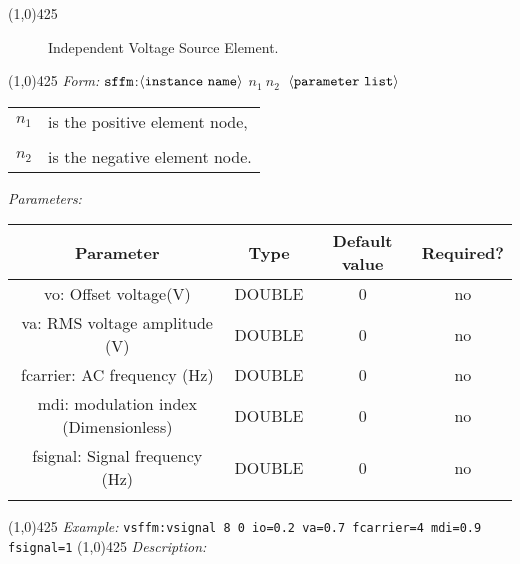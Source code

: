 \documentclass{article}
\begin{document}
\hrulefill\linethickness{0.5mm}\line(1,0){425}
\normalsize
\newline
\begin{figure}[h]
\centerline{\epsfxsize=0.5in}
\caption{Independent Voltage Source Element.}
\end{figure}
\newline
\linethickness{0.5mm} \line(1,0){425}
\newline
\textit{Form:}
$\tt sffm$:$\langle \tt{instance\ name}\rangle$
$n_1\ n_2\ $ $\langle \tt{parameter\ list}\rangle$
\newline
\begin{tabular}{r l}
$n_1$ & is the positive element node, \\
&  \\
$n_2$ & is the negative element node. \\
\end{tabular}
\newline
\textit{Parameters:}
\begin{table}[H]
\begin{tabular}{|c|c|c|c|}
\hline
Parameter&Type&Default value&Required?\\
\hline
vo: Offset voltage(V) & DOUBLE & 0 & no\\
\hline
va: RMS voltage amplitude (V) & DOUBLE & 0 & no\\
\hline
fcarrier: AC frequency (Hz) & DOUBLE & 0 & no\\
\hline
mdi: modulation index (Dimensionless) & DOUBLE & 0 & no\\
\hline
fsignal: Signal frequency (Hz) & DOUBLE & 0 & no\\
\par
\hline
\end{tabular}
\end{table}
\noindent\linethickness{0.5mm}\line(1,0){425}
\newline
\textit{Example:}
\newline
\texttt{vsffm:vsignal\ 8\ 0\ io=0.2 va=0.7 fcarrier=4 mdi=0.9
fsignal=1}
\newline
\linethickness{0.5mm} \line(1,0){425}
\newline
\textit{Description:}\\
\end{document}
